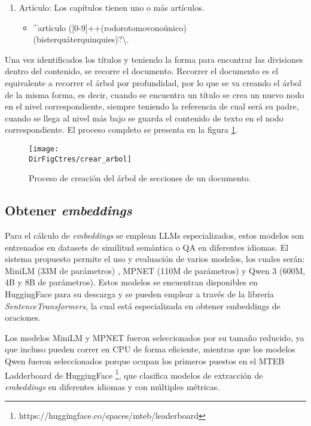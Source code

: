 \begin{enumerate}
    \item Artículo: Los capítulos tienen uno o más artículos.
          \begin{itemize}
              \item  \string^artículo ([0-9]+\textbar[a-zé]+(ro\textbar do\textbar ro\textbar to\textbar mo\textbar vo\textbar no\textbar único)\\
                    (bis\textbar ter\textbar quáter\textbar quinquies)?\textbackslash.
          \end{itemize}
\end{enumerate}

Una vez identificados los títulos y teniendo la forma para encontrar las
divisiones dentro del contenido, se recorre el documento. Recorrer
el documento es el equivalente a recorrer el árbol por profundidad, por lo
que se va creando el árbol de la misma forma, es decir, cuando se encuentra
un título se crea un nuevo nodo en el nivel correspondiente, siempre teniendo
la referencia de cual será su padre, cuando se llega al nivel más bajo se
guarda el contenido de texto en el nodo correspondiente.
El proceso completo se presenta en la figura
\ref{fig:crear_arbol}.

\begin{figure}[]
    \centering
    \texttt{[image: \\DirFigCtres/crear\_arbol]}
    \caption{Proceso de creación del árbol de secciones de un documento.}
    \label{fig:crear_arbol}
\end{figure}

\subsection{Obtener \textit{embeddings}}

Para el cálculo de \textit{embeddings} se emplean LLMs especializados,
estos modelos son entrenados en datasets de similitud semántica o QA en
diferentes idiomas. El sistema propuesto permite el uso y evaluación de
varios modelos, los cuales serán: MiniLM (33M de parámetros)
\cite{wang_minilm_2020}, MPNET \cite{hagen_mpnet_2020} (110M de parámetros)
y Qwen 3 \cite{zhang_qwen3_2025} (600M, 4B y 8B de parámetros). Estos modelos
se encuentran disponibles en HuggingFace para su descarga y se pueden
emplear a través de la librería \textit{SentenceTransformers}, la cual está especializada
en obtener embeddings de oraciones.

Los modelos MiniLM y MPNET fueron seleccionados por su tamaño reducido,
ya que incluso pueden correr en CPU de forma eficiente, mientras que los
modelos Qwen fueron seleccionados porque ocupan los primeros puestos en el
MTEB Ladderboard de HuggingFace \footnote{https://huggingface.co/spaces/mteb/leaderboard},
que clasifica modelos de extracción de \textit{embeddings} en diferentes idiomas
y con múltiples métricas.

